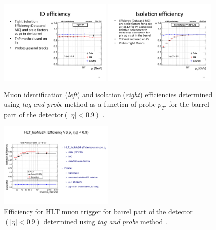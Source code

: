 \begin{figure}[htbp]
	\centering
		\includegraphics[width=0.49\textwidth]{Figures/ID_eff.pdf}
		\includegraphics[width=0.49\textwidth]{Figures/ISO_eff.pdf}
	\caption[Muon identification and isolation efficiencies using \textit{tag and probe} method.]{Muon identification (\textit{left}) and isolation (\textit{right}) efficiencies determined using \textit{tag and probe} method as a function of probe $p_T$, for the barrel part of the detector$(|\eta|<0.9)$ \cite{1748-0221-7-10-P10002}.}
	\label{fig:eff_IDISO}
\end{figure}

\begin{figure}[htbp]
	\centering
		\includegraphics[width=0.5\textwidth]{Figures/trig_eff.pdf}
	\caption[Muon trigger efficiency using \textit{tag and probe} method.]{Efficiency for HLT muon trigger for barrel part of the detector $(|\eta|<0.9)$ determined using \textit{tag and probe} method .}
	\label{fig:eff_trig}
\end{figure}  

